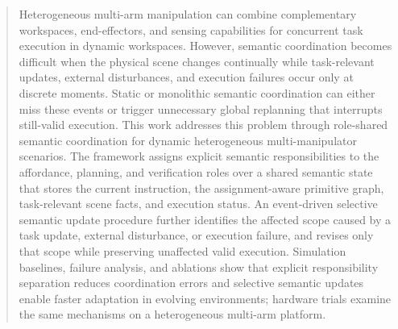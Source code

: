 \begin{abstract}
Heterogeneous multi-arm manipulation can combine complementary workspaces,
end-effectors, and sensing capabilities for concurrent task execution in
dynamic workspaces. However, semantic coordination becomes difficult when the
physical scene changes continually while task-relevant updates, external
disturbances, and execution failures occur only at discrete moments. Static or
monolithic semantic coordination can either miss these events or trigger
unnecessary global replanning that interrupts still-valid execution. This work
addresses this problem through role-shared semantic coordination for dynamic
heterogeneous multi-manipulator scenarios. The framework assigns explicit
semantic responsibilities to the affordance, planning, and verification roles
over a shared semantic state that stores the current instruction, the
assignment-aware primitive graph, task-relevant scene facts, and execution
status. An event-driven selective semantic update procedure further identifies
the affected scope caused by a task update, external disturbance, or execution
failure, and revises only that scope while preserving unaffected valid
execution. Simulation baselines, failure analysis, and ablations show that
explicit responsibility separation reduces coordination errors and selective
semantic updates enable faster adaptation in evolving environments; hardware
trials examine the same mechanisms on a heterogeneous multi-arm platform.
\end{abstract}
